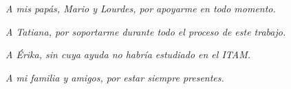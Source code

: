 \chapter*{\phantom{Dedicatoria}}

\hfil \textit{A mis papás, Mario y Lourdes, por apoyarme en todo momento.} \hfil

\hfil \textit{A Tatiana, por soportarme durante todo el proceso de este trabajo.} \hfil

\hfil \textit{A Érika, sin cuya ayuda no habría estudiado en el ITAM.} \hfil

\hfil \textit{A mi familia y amigos, por estar siempre presentes.} \hfil


